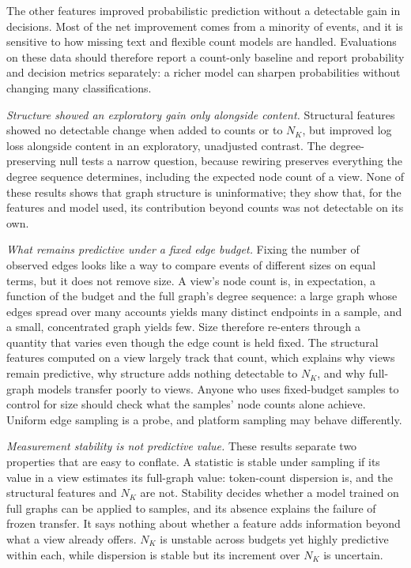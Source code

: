 \documentclass[conference]{IEEEtran}
\newcommand{\NK}{N_K}
\begin{document}
The other features improved probabilistic prediction without a detectable gain in decisions. Most of the net improvement comes from a minority of events, and it is sensitive to how missing text and flexible count models are handled. Evaluations on these data should therefore report a count-only baseline and report probability and decision metrics separately: a richer model can sharpen probabilities without changing many classifications.

\emph{Structure showed an exploratory gain only alongside content.} Structural features showed no detectable change when added to counts or to $\NK$, but improved log loss alongside content in an exploratory, unadjusted contrast. The degree-preserving null tests a narrow question, because rewiring preserves everything the degree sequence determines, including the expected node count of a view. None of these results shows that graph structure is uninformative; they show that, for the features and model used, its contribution beyond counts was not detectable on its own.

\emph{What remains predictive under a fixed edge budget.} Fixing the number of observed edges looks like a way to compare events of different sizes on equal terms, but it does not remove size. A view's node count is, in expectation, a function of the budget and the full graph's degree sequence: a large graph whose edges spread over many accounts yields many distinct endpoints in a sample, and a small, concentrated graph yields few. Size therefore re-enters through a quantity that varies even though the edge count is held fixed. The structural features computed on a view largely track that count, which explains why views remain predictive, why structure adds nothing detectable to $\NK$, and why full-graph models transfer poorly to views. Anyone who uses fixed-budget samples to control for size should check what the samples' node counts alone achieve. Uniform edge sampling is a probe, and platform sampling may behave differently.

\emph{Measurement stability is not predictive value.} These results separate two properties that are easy to conflate. A statistic is stable under sampling if its value in a view estimates its full-graph value: token-count dispersion is, and the structural features and $\NK$ are not. Stability decides whether a model trained on full graphs can be applied to samples, and its absence explains the failure of frozen transfer. It says nothing about whether a feature adds information beyond what a view already offers. $\NK$ is unstable across budgets yet highly predictive within each, while dispersion is stable but its increment over $\NK$ is uncertain.
\end{document}
